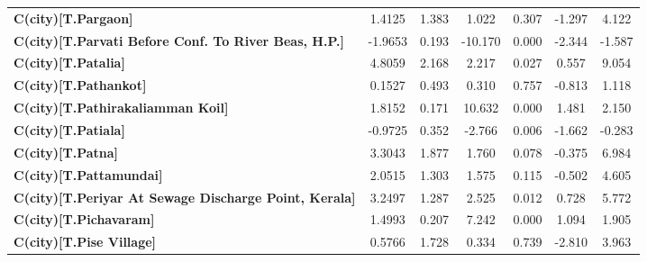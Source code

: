 \begin{center}
\begin{tabular}{lcccccc}
\textbf{C(city)[T.Pargaon]}                                                                         &       1.4125  &        1.383     &     1.022  &         0.307        &       -1.297    &        4.122     \\
\textbf{C(city)[T.Parvati Before Conf. To River Beas, H.P.]}                                        &      -1.9653  &        0.193     &   -10.170  &         0.000        &       -2.344    &       -1.587     \\
\textbf{C(city)[T.Patalia]}                                                                         &       4.8059  &        2.168     &     2.217  &         0.027        &        0.557    &        9.054     \\
\textbf{C(city)[T.Pathankot]}                                                                       &       0.1527  &        0.493     &     0.310  &         0.757        &       -0.813    &        1.118     \\
\textbf{C(city)[T.Pathirakaliamman Koil]}                                                           &       1.8152  &        0.171     &    10.632  &         0.000        &        1.481    &        2.150     \\
\textbf{C(city)[T.Patiala]}                                                                         &      -0.9725  &        0.352     &    -2.766  &         0.006        &       -1.662    &       -0.283     \\
\textbf{C(city)[T.Patna]}                                                                           &       3.3043  &        1.877     &     1.760  &         0.078        &       -0.375    &        6.984     \\
\textbf{C(city)[T.Pattamundai]}                                                                     &       2.0515  &        1.303     &     1.575  &         0.115        &       -0.502    &        4.605     \\
\textbf{C(city)[T.Periyar At Sewage Discharge Point, Kerala]}                                       &       3.2497  &        1.287     &     2.525  &         0.012        &        0.728    &        5.772     \\
\textbf{C(city)[T.Pichavaram]}                                                                      &       1.4993  &        0.207     &     7.242  &         0.000        &        1.094    &        1.905     \\
\textbf{C(city)[T.Pise Village]}                                                                    &       0.5766  &        1.728     &     0.334  &         0.739        &       -2.810    &        3.963     \\

\end{tabular}
\end{center}
